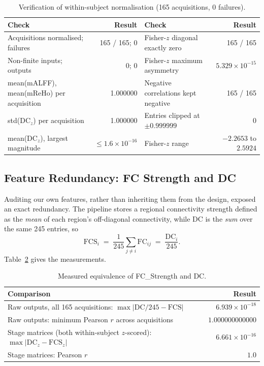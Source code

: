 \documentclass{ssnreview}
\begin{document}
\begin{table}[!htbp]
\centering
\caption{Verification of within-subject normalisation (165 acquisitions, 0 failures).}
\label{tab:normcheck}
\footnotesize
\begin{tabularx}{\textwidth}{@{}>{\raggedright\arraybackslash}Xr>{\raggedright\arraybackslash}Xr@{}}
\toprule
\textbf{Check} & \textbf{Result} & \textbf{Check} & \textbf{Result} \\
\midrule
Acquisitions normalised; failures & 165 / 165; 0 & Fisher-$z$ diagonal exactly zero & 165 / 165 \\
Non-finite inputs; outputs & 0; 0 & Fisher-$z$ maximum asymmetry & $5.329\times10^{-15}$ \\
mean(mALFF), mean(mReHo) per acquisition & 1.000000 & Negative correlations kept negative & 165 / 165 \\
std(DC$_z$) per acquisition & 1.000000 & Entries clipped at $\pm0.999999$ & 0 \\
mean(DC$_z$), largest magnitude & $\leq 1.6\times10^{-16}$ & Fisher-$z$ range & $-2.2653$ to $2.5924$ \\
\bottomrule
\end{tabularx}
\end{table}

\subsection{Feature Redundancy: FC Strength and DC}\label{sec:redundancy}

Auditing our own features, rather than inheriting them from the design, exposed an
exact redundancy. The pipeline stores a regional connectivity strength defined as the
\emph{mean} of each region's off-diagonal connectivity, while DC is the \emph{sum}
over the same 245 entries, so
\[
  \mathrm{FCS}_i \;=\; \frac{1}{245}\sum_{j\neq i}\mathrm{FC}_{ij}
  \;=\; \frac{\mathrm{DC}_i}{245}.
\]
Table~\ref{tab:redundancy} gives the measurements.

\begin{table}[!htbp]
\centering
\caption{Measured equivalence of FC\_Strength and DC.}
\label{tab:redundancy}
\small
\begin{tabularx}{\textwidth}{@{}>{\raggedright\arraybackslash}Xr@{}}
\toprule
\textbf{Comparison} & \textbf{Result} \\
\midrule
Raw outputs, all 165 acquisitions: $\max|\mathrm{DC}/245-\mathrm{FCS}|$ & $6.939\times10^{-18}$ \\
Raw outputs: minimum Pearson $r$ across acquisitions & $1.000000000000$ \\
Stage matrices (both within-subject $z$-scored): $\max|\mathrm{DC}_z-\mathrm{FCS}_z|$ & $6.661\times10^{-16}$ \\
Stage matrices: Pearson $r$ & $1.0$ \\
\bottomrule
\end{tabularx}
\end{table}
\end{document}
